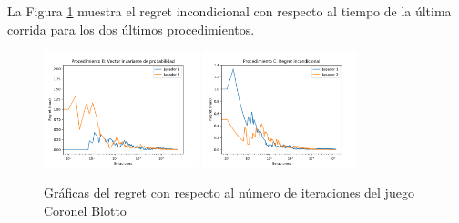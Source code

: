  La Figura \ref{fig:regret-coronel-blotto} muestra el regret incondicional con respecto al tiempo de la última corrida para los dos últimos procedimientos.
 
\begin{figure}[ht]
\caption{Gráficas del regret con respecto al número de iteraciones del juego Coronel Blotto}
\label{fig:regret-coronel-blotto}
\centering
\includegraphics[width=0.4\textwidth]{graficas/coronel-blotto/procedimiento-B.png}
\includegraphics[width=0.4\textwidth]{graficas/coronel-blotto/procedimiento-C.png}
\end{figure}

\newpage